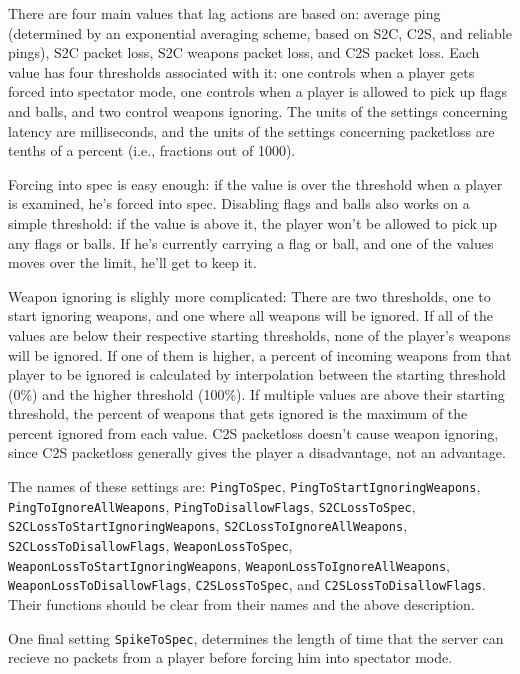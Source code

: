 \documentclass{article}
\begin{document}
There are four main values that lag actions are based on: average ping
(determined by an exponential averaging scheme, based on S2C, C2S, and
reliable pings), S2C packet loss, S2C weapons packet loss, and C2S
packet loss. Each value has four thresholds associated with it: one
controls when a player gets forced into spectator mode, one controls
when a player is allowed to pick up flags and balls, and two control
weapons ignoring. The units of the settings concerning latency are
milliseconds, and the units of the settings concerning packetloss are
tenths of a percent (i.e., fractions out of 1000).

Forcing into spec is easy enough: if the value is over the threshold
when a player is examined, he's forced into spec. Disabling flags and
balls also works on a simple threshold: if the value is above it, the
player won't be allowed to pick up any flags or balls. If he's currently
carrying a flag or ball, and one of the values moves over the limit,
he'll get to keep it.

Weapon ignoring is slighly more complicated: There are two thresholds,
one to start ignoring weapons, and one where all weapons will be
ignored. If all of the values are below their respective starting
thresholds, none of the player's weapons will be ignored. If one of them
is higher, a percent of incoming weapons from that player to be ignored
is calculated by interpolation between the starting threshold (0\%) and
the higher threshold (100\%). If multiple values are above their
starting threshold, the percent of weapons that gets ignored is the
maximum of the percent ignored from each value. C2S packetloss doesn't
cause weapon ignoring, since C2S packetloss generally gives the player a
disadvantage, not an advantage.

The names of these settings are:
\texttt{PingToSpec},
\texttt{PingToStartIgnoringWeapons},
\texttt{PingToIgnoreAllWeapons},
\texttt{PingToDisallowFlags},
\texttt{S2CLossToSpec},
\texttt{S2CLossToStartIgnoringWeapons},
\texttt{S2CLossToIgnoreAllWeapons},
\texttt{S2CLossToDisallowFlags},
\texttt{WeaponLossToSpec},
\texttt{WeaponLossToStartIgnoringWeapons},
\texttt{WeaponLossToIgnoreAllWeapons},
\texttt{WeaponLossToDisallowFlags},
\texttt{C2SLossToSpec},
and
\texttt{C2SLossToDisallowFlags}. Their functions should be clear from
their names and the above description.

One final setting \texttt{SpikeToSpec}, determines the length of time that the server can
recieve no packets from a player before forcing him into spectator mode.
\end{document}
